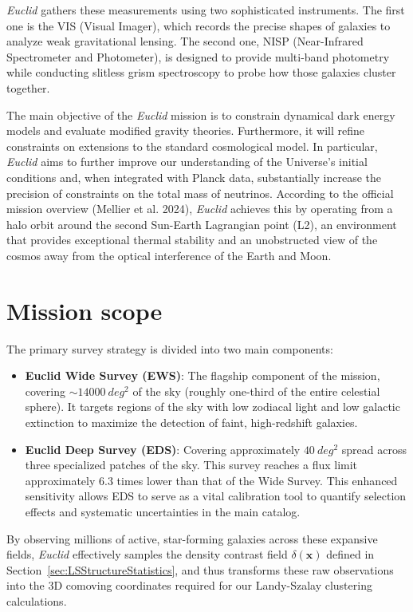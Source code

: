 \documentclass[12pt,a4paper,oneside]{report}
\begin{document}
\textit{Euclid} gathers these measurements using two sophisticated instruments. The first one is the VIS (Visual Imager), which records the precise shapes of galaxies to analyze weak gravitational lensing. The second one, NISP (Near-Infrared Spectrometer and Photometer), is designed to provide multi-band photometry while conducting slitless grism spectroscopy to probe how those galaxies cluster together.

The main objective of the \textit{Euclid} mission is to constrain dynamical dark energy models and evaluate modified gravity theories. Furthermore, it will refine constraints on extensions to the standard cosmological model. In particular, \textit{Euclid} aims to further improve our understanding of the Universe's initial conditions and, when integrated with Planck data, substantially increase the precision of constraints on the total mass of neutrinos. According to the official mission overview (Mellier et al. 2024), \textit{Euclid} achieves this by operating from a halo orbit around the second Sun-Earth Lagrangian point (L2), an environment that provides exceptional thermal stability and an unobstructed view of the cosmos away from the optical interference of the Earth and Moon.

\section{Mission scope}\label{sec:MissionScope}
The primary survey strategy is divided into two main components:
\begin{itemize}
  \item \textbf{Euclid Wide Survey (EWS)}: The flagship component of the mission, covering $\sim \SI{14000}{deg^2}$ of the sky (roughly one-third of the entire celestial sphere). It targets regions of the sky with low zodiacal light and low galactic extinction to maximize the detection of faint, high-redshift galaxies.
  \item \textbf{Euclid Deep Survey (EDS)}: Covering approximately $\SI{40}{deg^2}$ spread across three specialized patches of the sky. This survey reaches a flux limit approximately $6.3$ times lower than that of the Wide Survey. This enhanced sensitivity allows EDS to serve as a vital calibration tool to quantify selection effects and systematic uncertainties in the main catalog.
\end{itemize}
By observing millions of active, star-forming galaxies across these expansive fields, \textit{Euclid} effectively samples the density contrast field $\delta(\mathbf{x})$ defined in Section~\ref{sec:LSStructureStatistics}, and thus transforms these raw observations into the 3D comoving coordinates required for our Landy-Szalay clustering calculations.
\end{document}
